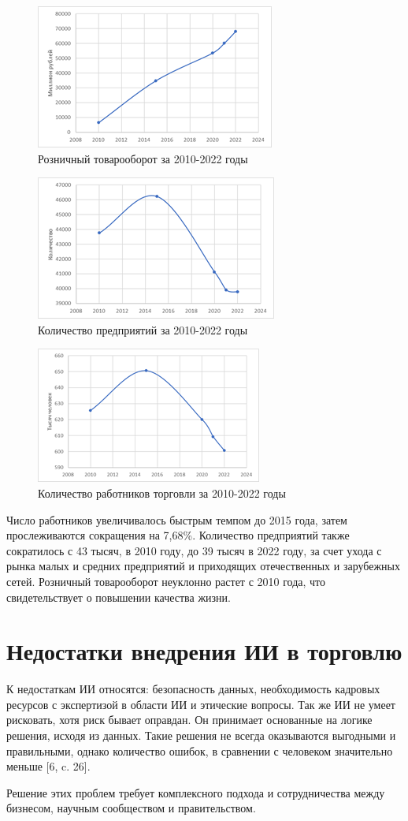 \documentclass{article}
\begin{document}
\begin{figure}
    \centering
    \includegraphics[width=0.45\linewidth]{image1.png}
    \caption{Розничный товарооборот за 2010-2022 годы}
\end{figure}
\begin{figure}
    \centering
    \includegraphics[width=0.45\linewidth]{image2.png}
    \caption{Количество предприятий за 2010-2022 годы}
\end{figure}
\begin{figure}
    \centering
    \includegraphics[width=0.45\linewidth]{image3.png}
    \caption{Количество работников торговли за 2010-2022 годы}
\end{figure}

Число работников увеличивалось быстрым темпом до 2015 года, затем прослеживаются сокращения на 7,68\%. Количество предприятий также сократилось с 43 тысяч, в 2010 году, до 39 тысяч в 2022 году, за счет ухода с рынка малых и средних предприятий и приходящих отечественных и зарубежных сетей. Розничный товарооборот неуклонно растет с 2010 года, что свидетельствует о повышении качества жизни.

\section*{\hspace{10mm}Недостатки внедрения ИИ в торговлю}
\normalsize{\hspace{5mm}К недостаткам ИИ относятся: безопасность данных, необходимость кадровых ресурсов с экспертизой в области ИИ и этические вопросы. Так же ИИ не умеет рисковать, хотя риск бывает оправдан. Он принимает основанные на логике решения, исходя из данных. Такие решения не всегда оказываются выгодными и правильными, однако количество ошибок, в сравнении с человеком значительно меньше [6, c. 26].

Решение этих проблем требует комплексного подхода и сотрудничества между бизнесом, научным сообществом и правительством.}
\end{document}
